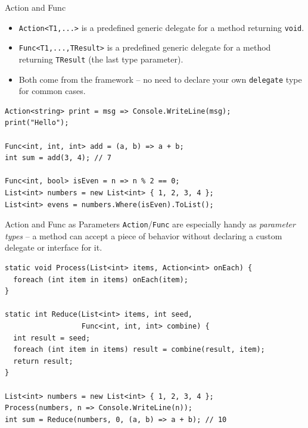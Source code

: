\begin{frame}[fragile]{Action and Func}
  \begin{itemize}
    \item \texttt{Action<T1,...>} is a predefined generic delegate for
      a method returning \texttt{void}.
    \item \texttt{Func<T1,...,TResult>} is a predefined generic delegate
      for a method returning \texttt{TResult} (the last type parameter).
    \item Both come from the framework -- no need to declare your own
      \texttt{delegate} type for common cases.
  \end{itemize}
  \begin{lstlisting}
Action<string> print = msg => Console.WriteLine(msg);
print("Hello");

Func<int, int, int> add = (a, b) => a + b;
int sum = add(3, 4); // 7

Func<int, bool> isEven = n => n % 2 == 0;
List<int> numbers = new List<int> { 1, 2, 3, 4 };
List<int> evens = numbers.Where(isEven).ToList();
  \end{lstlisting}
\end{frame}

\begin{frame}[fragile]{Action and Func as Parameters}
  \texttt{Action}/\texttt{Func} are especially handy as
  \emph{parameter types} -- a method can accept a piece of behavior
  without declaring a custom delegate or interface for it.
  \begin{lstlisting}[basicstyle=\scriptsize\ttfamily]
static void Process(List<int> items, Action<int> onEach) {
  foreach (int item in items) onEach(item);
}

static int Reduce(List<int> items, int seed,
                  Func<int, int, int> combine) {
  int result = seed;
  foreach (int item in items) result = combine(result, item);
  return result;
}

List<int> numbers = new List<int> { 1, 2, 3, 4 };
Process(numbers, n => Console.WriteLine(n));
int sum = Reduce(numbers, 0, (a, b) => a + b); // 10
  \end{lstlisting}
\end{frame}

